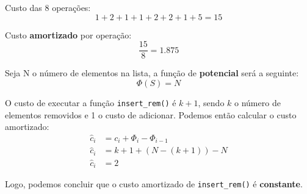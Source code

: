\documentclass[a4paper,11pt]{article}
\begin{document}
	\newpage
	
	\noindent Custo das 8 operações:
	\[
		1 + 2 + 1 + 1 + 2 + 2 + 1 + 5 = 15
	\]
	
	\noindent Custo \textbf{amortizado} por operação:
	\[
		\frac{15}{8} = 1.875
	\]
	
	\noindent Seja N o número de elementos na lista, a função de \textbf{potencial} será a seguinte:
	\[
		\Phi(S) = N
	\]

	\noindent O custo de executar a função \texttt{insert\_rem()} é $ k + 1 $, sendo $k$ o número de elementos removidos e 1 o custo de adicionar. Podemos então calcular o custo amortizado:
	\begin{align*}
		\hat{c}_i & = c_i + \Phi_i - \Phi_{i-1} \\
		\hat{c}_i & = k + 1 + (N - (k + 1)) - N \\
		\hat{c}_i & = 2
	\end{align*}
	
	\noindent Logo, podemos concluir que o custo amortizado de \texttt{insert\_rem()} é \textbf{constante}.
	
	
\end{document}
